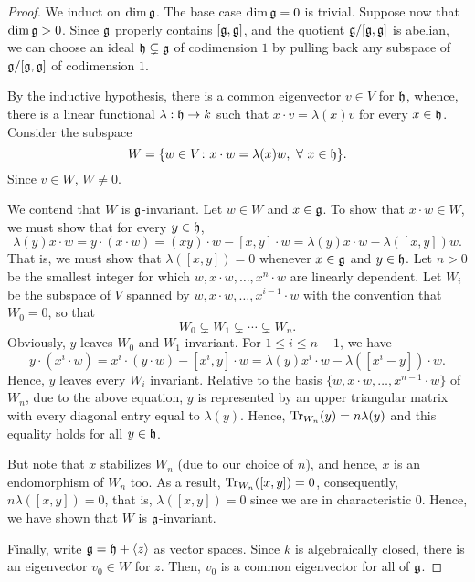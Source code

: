 \begin{proof}
    We induct on $\dim\mathfrak{g}$. The base case $\dim\mathfrak{g} = 0$ is trivial. Suppose now that $\dim\mathfrak{g} > 0$. Since $\mathfrak{g}$ properly contains $[\mathfrak{g},\mathfrak{g}]$, and the quotient $\mathfrak{g}/[\mathfrak{g},\mathfrak{g}]$ is abelian, we can choose an ideal $\mathfrak{h}\subsetneq\mathfrak{g}$ of codimension $1$ by pulling back any subspace of $\mathfrak{g}/[\mathfrak{g},\mathfrak{g}]$ of codimension $1$.

    By the inductive hypothesis, there is a common eigenvector $v\in V$ for $\mathfrak{h}$, whence, there is a linear functional $\lambda:\mathfrak{h}\to k$ such that $x\cdot v = \lambda(x)v$ for every $x\in\mathfrak{h}$. Consider the subspace 
    \begin{equation*}
        W = \{w\in V\colon x\cdot w = \lambda(x)w,~\forall~x\in\mathfrak{h}\}.
    \end{equation*}
    Since $v\in W$, $W\ne 0$.

    We contend that $W$ is $\mathfrak{g}$-invariant. Let $w\in W$ and $x\in\mathfrak{g}$. To show that $x\cdot w\in W$, we must show that for every $y\in\mathfrak{h}$, 
    \begin{equation*}
        \lambda(y) x\cdot w = y\cdot(x\cdot w) = (xy)\cdot w - [x, y]\cdot w = \lambda(y) x\cdot w - \lambda([x, y]) w.
    \end{equation*}
    That is, we must show that $\lambda([x, y]) = 0$ whenever $x\in\mathfrak{g}$ and $y\in\mathfrak{h}$. Let $n > 0$ be the smallest integer for which $w, x\cdot w, \dots, x^n\cdot w$ are linearly dependent. Let $W_i$ be the subspace of $V$ spanned by $w, x\cdot w,\dots, x^{i - 1}\cdot w$ with the convention that $W_0 = 0$, so that 
    \begin{equation*}
        W_0\subsetneq W_1\subsetneq\cdots\subsetneq W_n.
    \end{equation*}
    Obviously, $y$ leaves $W_0$ and $W_1$ invariant. For $1\le i\le n - 1$, we have
    \begin{equation*}
        y\cdot(x^i\cdot w) = x^i\cdot(y\cdot w) - [x^i, y]\cdot w = \lambda(y) x^i\cdot w - \lambda([x^i - y])\cdot w.
    \end{equation*}
    Hence, $y$ leaves every $W_i$ invariant. Relative to the basis $\{w, x\cdot w,\dots, x^{n - 1}\cdot w\}$ of $W_n$, due to the above equation, $y$ is represented by an upper triangular matrix with every diagonal entry equal to $\lambda(y)$. Hence, $\operatorname{Tr}_{W_n}(y) = n\lambda(y)$ and this equality holds for all $y\in\mathfrak{h}$.

    But note that $x$ stabilizes $W_n$ (due to our choice of $n$), and hence, $x$ is an endomorphism of $W_n$ too. As a result, $\operatorname{Tr}_{W_n}([x, y]) = 0$, consequently, $n\lambda([x, y]) = 0$, that is, $\lambda([x, y]) = 0$ since we are in characteristic $0$. Hence, we have shown that $W$ is $\mathfrak{g}$-invariant.

    Finally, write $\mathfrak{g} = \mathfrak{h} + \langle z\rangle$ as vector spaces. Since $k$ is algebraically closed, there is an eigenvector $v_0\in W$ for $z$. Then, $v_0$ is a common eigenvector for all of $\mathfrak{g}$.
\end{proof}


